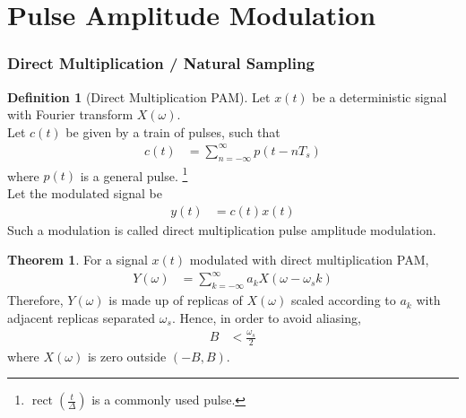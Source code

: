 \documentclass[titlepage, fleqn, a4paper, 12pt, twoside]{article}
\theoremstyle{definition}
\newtheorem{definition}{Definition}
\theoremstyle{theorem}
\newtheorem{theorem}{Theorem}
\DeclareMathOperator{\rect}{\mathrm{rect}}
\begin{document}
\clearpage
\part{Pulse Amplitude Modulation}

\section{Direct Multiplication / Natural Sampling}

\begin{definition}[Direct Multiplication PAM]
	Let $x(t)$ be a deterministic signal with Fourier transform $X(\omega)$.\\
	Let $c(t)$ be given by a train of pulses, such that
	\begin{align*}
		c(t) &= \sum\limits_{n = -\infty}^{\infty} p(t - n T_s)
	\end{align*}
	where $p(t)$ is a general pulse.
	\footnote{$\rect\left( \frac{t}{\Delta} \right)$ is a commonly used pulse.}\\
	Let the modulated signal be
	\begin{align*}
		y(t) &= c(t) x(t)
	\end{align*}
	Such a modulation is called direct multiplication pulse amplitude modulation.
	\label{def:direct_multiplication_PAM}
\end{definition}

\begin{theorem}
	For a signal $x(t)$ modulated with direct multiplication PAM,
	\begin{align*}
		Y(\omega) &= \sum\limits_{k = -\infty}^{\infty} a_k X(\omega - \omega_s k)
	\end{align*}
	Therefore, $Y(\omega)$ is made up of replicas of $X(\omega)$ scaled according to $a_k$ with adjacent replicas separated $\omega_s$.
	Hence, in order to avoid aliasing,
	\begin{align*}
		B &< \frac{\omega_s}{2}
	\end{align*}
	where $X(\omega)$ is zero outside $(-B,B)$.
	\label{thm:Fourier_transform_of_signal_modulated_by_direct_multiplication_PAM}
\end{theorem}
\end{document}
